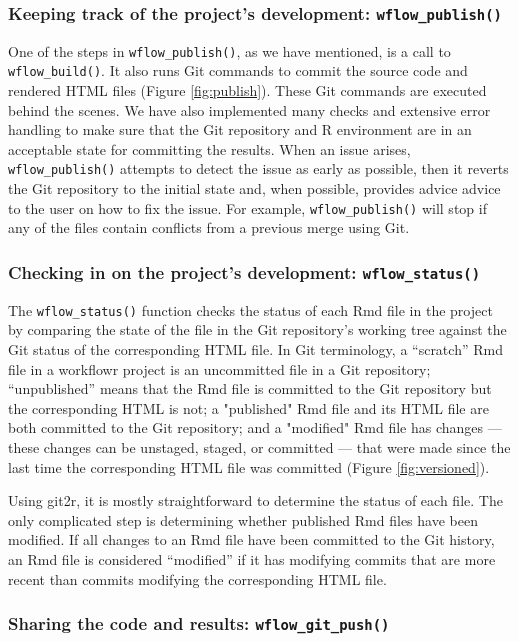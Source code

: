 \documentclass[9pt,a4paper]{extarticle}
\begin{document}
\subsubsection*{Keeping track of the project's development: \texttt{wflow\_publish()}}

One of the steps in \texttt{wflow\_publish()}, as we have mentioned, is a call to
\texttt{wflow\_build()}. It also runs Git commands to commit the source code and
rendered HTML files (Figure \ref{fig:publish}). These Git commands are executed behind
the scenes. We have also implemented many checks and extensive error
handling to make sure that the Git repository and R environment are in
an acceptable state for committing the results. When an issue arises,
\texttt{wflow\_publish()} attempts to detect the issue as early as possible, then
it reverts the Git repository to the initial state and, when possible,
provides advice advice to the user on how to fix the issue. For example,
\texttt{wflow\_publish()} will stop if any of the files contain conflicts from a
previous merge using Git.

\subsubsection*{Checking in on the project's development: \texttt{wflow\_status()}}

The \texttt{wflow\_status()} function checks the status of each Rmd file in the
project by comparing the state of the file in the Git repository's
working tree against the Git status of the corresponding HTML file. In
Git terminology, a “scratch” Rmd file in a workflowr project is an
uncommitted file in a Git repository; “unpublished” means that the Rmd
file is committed to the Git repository but the corresponding HTML is
not; a "published" Rmd file and its HTML file are both committed to the
Git repository; and a "modified" Rmd file has changes --- these changes
can be unstaged, staged, or committed --- that were made since the last
time the corresponding HTML file was committed (Figure \ref{fig:versioned}).

Using git2r, it is mostly straightforward to determine the status of
each file. The only complicated step is determining whether published
Rmd files have been modified. If all changes to an Rmd file have been
committed to the Git history, an Rmd file is considered “modified” if it
has modifying commits that are more recent than commits modifying the
corresponding HTML file.

\subsubsection*{Sharing the code and results: \texttt{wflow\_git\_push()}}
\end{document}
